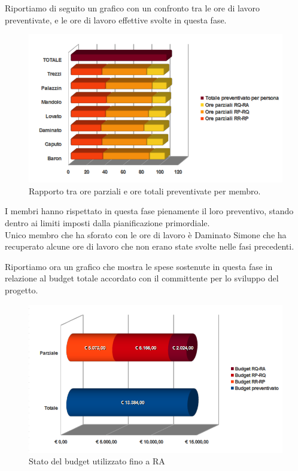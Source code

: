 \newpage
Riportiamo di seguito un grafico con un confronto tra le ore di lavoro
preventivate, e le ore di lavoro effettive svolte in questa fase.

\vspace{0cm}
\begin{figure}[htbp!]
  \centering
  \includegraphics[width=17.2cm, angle=0]{img/PP/ORE-RA.png}
\caption{Rapporto tra ore parziali e ore totali preventivate per membro.}
\end{figure}
\vspace{0.5cm}


I membri hanno rispettato in questa fase pienamente il loro preventivo, stando
dentro ai limiti imposti dalla pianificazione primordiale.\\ Unico membro che ha
sforato con le ore di lavoro \`e Daminato Simone che ha recuperato alcune ore di lavoro
che non erano state svolte nelle fasi precedenti.

\newpage
Riportiamo ora un grafico che mostra le spese sostenute in questa
fase in relazione al budget totale accordato con il committente per lo sviluppo del progetto.

\vspace{0cm}
\begin{figure}[htbp!]
  \centering
  \includegraphics[width=15cm, angle=0]{img/PP/BUDGET-RA.png}
\caption{Stato del budget utilizzato fino a RA}
\end{figure}
\vspace{0.5cm}


